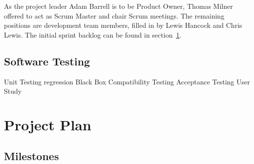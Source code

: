 \documentclass[11pt,a4paper]{article}
\renewcommand{\arraystretch}{1.5}
\begin{document}
As the project leader Adam Barrell is to be Product Owner, Thomas Milner offered to act as Scrum Master and chair Scrum meetings. The remaining positions are development team members, filled in by Lewis Hancock and Chris Lewis. The initial sprint backlog can be found in section~\ref{sec:project-plan}.

\subsection{Software Testing}
Unit Testing
	regression
	Black Box
Compatibility Testing
Acceptance Testing
User Study

\section{Project Plan}
\label{sec:project-plan}

\subsection{Milestones}
\label{sec:plan-milestones}

\renewcommand{\arraystretch}{1.5}
\newcommand*{\tableIndent}{\hspace*{0.4cm}}
\end{document}
